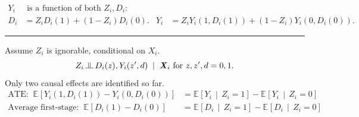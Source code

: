 \documentclass[dvipsnames,handout]{beamer} %
\renewcommand{\vec}[1]{\boldsymbol{\mathit{#1}}}                           %
\newcommand{\E}[2][]{\mathbb{E}_{#1} \left[ #2 \right]}                    %
\newcommand{\Egiven}[3][]{\mathbb{E}_{#1} \left[ #2 \, \middle\vert \, #3 \right]} %
\newcommand{\indep}{\, \raisebox{0.05em}{\rotatebox[origin=c]{90}{$\models$}} \,}%
\begin{document}
\begin{frame}
\begin{align*}
            Y_i& \text{ is a function of both } Z_i,D_i: \\
        D_i& = Z_i D_i(1) + (1 - Z_i) D_i(0). &
            Y_i& = Z_i Y_i(1, D_i(1)) + (1 - Z_i) Y_i(0, D_i(0)).
    \end{align*}
    \par\noindent\rule{\textwidth}{0.4pt}
    \pause
    Assume $Z_i$ is ignorable, conditional on $\vec X_i$.
    \[ Z_i \indep  D_i(z), Y_i(z', d) \; \; | \;\; \vec X_i \text{ for } z, z', d = 0, 1. \]
    \pause
    Only two causal effects are identified so far.
    \begin{align*}
    \text{ATE:} \;\; \E{Y_i(1, D_i(1)) - Y_i(0, D_i(0))}
        &= \Egiven{Y_i}{Z_i = 1} - \Egiven{Y_i}{Z_i = 0} \\
    \text{Average first-stage:} \;\; \E{D_i(1) - D_i(0)}
        &=\Egiven{D_i}{Z_i = 1} - \Egiven{D_i}{Z_i = 0}
    \end{align*}
\end{frame}
\end{document}
